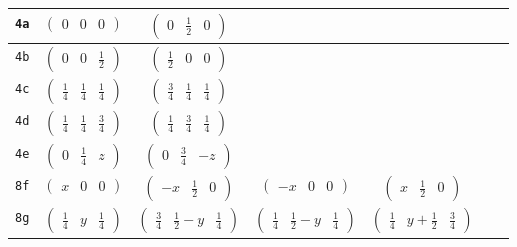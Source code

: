 \documentclass[fleqn,9pt,landscape]{jsarticle}
\begin{document}
\begin{center}
\begin{longtable}{ccccccc}
{\tt 4a} & $ \begin{pmatrix} 0 & 0 & 0 \end{pmatrix} $ & $ \begin{pmatrix} 0 & \frac{1}{2} & 0 \end{pmatrix} $ & $  $ & $  $ & $  $ & $  $ \\ \hline
{\tt 4b} & $ \begin{pmatrix} 0 & 0 & \frac{1}{2} \end{pmatrix} $ & $ \begin{pmatrix} \frac{1}{2} & 0 & 0 \end{pmatrix} $ & $  $ & $  $ & $  $ & $  $ \\ \hline
{\tt 4c} & $ \begin{pmatrix} \frac{1}{4} & \frac{1}{4} & \frac{1}{4} \end{pmatrix} $ & $ \begin{pmatrix} \frac{3}{4} & \frac{1}{4} & \frac{1}{4} \end{pmatrix} $ & $  $ & $  $ & $  $ & $  $ \\ \hline
{\tt 4d} & $ \begin{pmatrix} \frac{1}{4} & \frac{1}{4} & \frac{3}{4} \end{pmatrix} $ & $ \begin{pmatrix} \frac{1}{4} & \frac{3}{4} & \frac{1}{4} \end{pmatrix} $ & $  $ & $  $ & $  $ & $  $ \\ \hline
{\tt 4e} & $ \begin{pmatrix} 0 & \frac{1}{4} & z \end{pmatrix} $ & $ \begin{pmatrix} 0 & \frac{3}{4} & - z \end{pmatrix} $ & $  $ & $  $ & $  $ & $  $ \\ \hline
{\tt 8f} & $ \begin{pmatrix} x & 0 & 0 \end{pmatrix} $ & $ \begin{pmatrix} - x & \frac{1}{2} & 0 \end{pmatrix} $ & $ \begin{pmatrix} - x & 0 & 0 \end{pmatrix} $ & $ \begin{pmatrix} x & \frac{1}{2} & 0 \end{pmatrix} $ & $  $ & $  $ \\ \hline
{\tt 8g} & $ \begin{pmatrix} \frac{1}{4} & y & \frac{1}{4} \end{pmatrix} $ & $ \begin{pmatrix} \frac{3}{4} & \frac{1}{2} - y & \frac{1}{4} \end{pmatrix} $ & $ \begin{pmatrix} \frac{1}{4} & \frac{1}{2} - y & \frac{1}{4} \end{pmatrix} $ & $ \begin{pmatrix} \frac{1}{4} & y + \frac{1}{2} & \frac{3}{4} \end{pmatrix} $ & $  $ & $  $ \\ \hline

\end{longtable}
\end{center}
\end{document}
